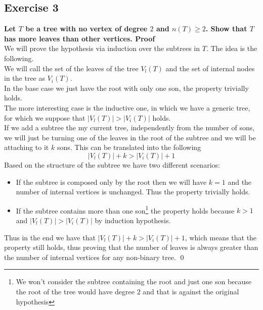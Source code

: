 \subsection*{Exercise 3}
\boldmath 
\textbf{Let $T$ be a tree with no vertex of degree $2$ and $n(T) \geq 2$. Show that $T$ has more leaves than
other vertices. \spacer
Proof} \\
\unboldmath
We will prove the hypothesis via induction over the subtrees in $T$. The idea is the following.\\ 
\linebreak 
We will call the set of the leaves of the tree $V_l(T)$ and the set of internal nodes in the tree as
$V_i(T)$.\\ 
\linebreak 
In the base case we just have the root with only one son, the
property trivially holds.\\
\linebreak
The more interesting case is the inductive one, in which we have a generic tree, for which we suppose that $|V_l(T)| > |V_i(T)|$ holds.\\
\linebreak 
If we add a subtree the my current tree, independently from the number of sons, we will just be turning one of the leaves in the root of the subtree and we will be attaching to it $k$ sons. This can be translated into the following
\begin{equation}
    |V_l(T)| + k > |V_i(T)| + 1
\end{equation}
Based on the structure of the subtree we have two different scenarios:
\begin{itemize}
    \item If the subtree is composed only by the root then we will have $k = 1$ and the number of internal vertices is unchanged. Thus the property trivially holds.
    \item If the subtree contains more than one son\footnote{We won't consider the subtree containing the root and just one son because the root of the tree would have degree $2$ and that is against the original hypothesis} the property holds because $k > 1$ and $|V_l(T)| > |V_i(T)|$ by induction hypothesis.
\end{itemize}
Thus in the end we have that $|V_l(T)| + k > |V_i(T)| + 1$, which means that the property still holds, thus
proving that the number of leaves is always greater than the number of internal vertices for any non-binary tree. \qed